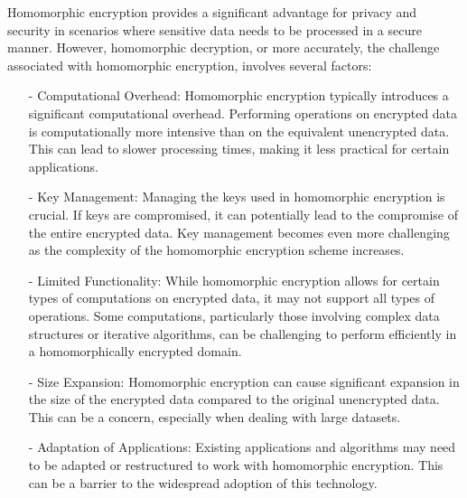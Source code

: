 \begin {itemize}
 
 
 
Homomorphic encryption  provides a significant advantage for privacy and security in scenarios where sensitive data needs to be processed in a secure manner. However, homomorphic decryption, or more accurately, the challenge associated with homomorphic encryption, involves several factors:
\begin{itemize}

  \item[-]   Computational Overhead: Homomorphic encryption typically introduces a significant computational overhead. Performing operations on encrypted data is computationally more intensive than on the equivalent unencrypted data. This can lead to slower processing times, making it less practical for certain applications.

 \item[-]    Key Management: Managing the keys used in homomorphic encryption is crucial. If keys are compromised, it can potentially lead to the compromise of the entire encrypted data. Key management becomes even more challenging as the complexity of the homomorphic encryption scheme increases.

 \item[-]    Limited Functionality: While homomorphic encryption allows for certain types of computations on encrypted data, it may not support all types of operations. Some computations, particularly those involving complex data structures or iterative algorithms, can be challenging to perform efficiently in a homomorphically encrypted domain.

  \item[-]   Size Expansion: Homomorphic encryption can cause significant expansion in the size of the encrypted data compared to the original unencrypted data. This can be a concern, especially when dealing with large datasets.

   \item[-]  Adaptation of Applications: Existing applications and algorithms may need to be adapted or restructured to work with homomorphic encryption. This can be a barrier to the widespread adoption of this technology.
\end{itemize}


\end{itemize}
